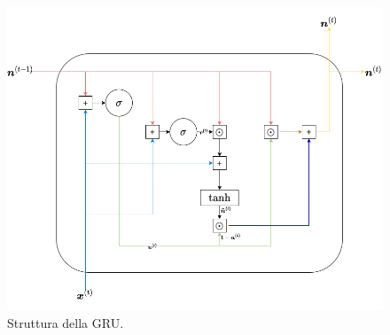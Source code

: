 \documentclass[../../main.tex]{subfiles}
\begin{document}
    \begin{figure}[H]
        \centering
        \includegraphics[width=\textwidth]{immagini/6_4/gruSchema.drawio.png}
        \caption{Struttura della GRU.}
        \label{fig:strutturaGRU}
    \end{figure}
\end{document}

